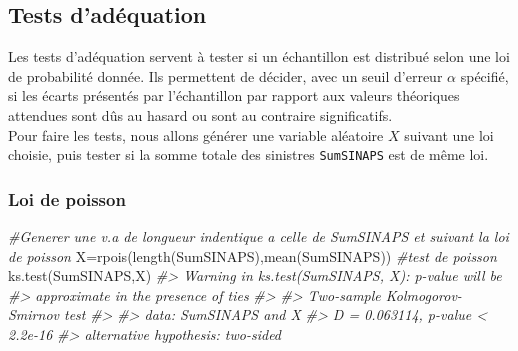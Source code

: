 \documentclass[
]{book}
\newenvironment{Shaded}{\begin{snugshade}}{\end{snugshade}}
\newcommand{\CommentTok}[1]{\textcolor[rgb]{0.56,0.35,0.01}{\textit{#1}}}
\newcommand{\FunctionTok}[1]{\textcolor[rgb]{0.00,0.00,0.00}{#1}}
\newcommand{\NormalTok}[1]{#1}
\newcommand{\OtherTok}[1]{\textcolor[rgb]{0.56,0.35,0.01}{#1}}
\newcommand{\SpecialCharTok}[1]{\textcolor[rgb]{0.00,0.00,0.00}{#1}}
\theoremstyle{definition}
\theoremstyle{definition}
\theoremstyle{definition}
\theoremstyle{definition}
\theoremstyle{remark}
\begin{document}
\hypertarget{tests-daduxe9quation}{%
\subsection{Tests d'adéquation}\label{tests-daduxe9quation}}

Les tests d'adéquation servent à tester si un échantillon est distribué selon une loi
de probabilité donnée. Ils permettent de décider, avec un seuil d'erreur \(\alpha\) spécifié, si les écarts présentés par l'échantillon par rapport aux valeurs théoriques attendues sont dûs au hasard ou sont au contraire significatifs.\\
Pour faire les tests, nous allons générer une variable aléatoire \(X\) suivant une loi choisie, puis tester si la somme totale des sinistres \texttt{SumSINAPS} est de même loi.

\begin{Shaded}
\end{Shaded}

\hypertarget{loi-de-poisson}{%
\subsubsection{Loi de poisson}\label{loi-de-poisson}}

\begin{Shaded}
\begin{Highlighting}[]
\CommentTok{\#Generer une v.a de longueur indentique a celle de SumSINAPS et suivant la loi de poisson}
\NormalTok{X}\OtherTok{=}\FunctionTok{rpois}\NormalTok{(}\FunctionTok{length}\NormalTok{(SumSINAPS),}\FunctionTok{mean}\NormalTok{(SumSINAPS))}
\CommentTok{\#test de poisson}
\FunctionTok{ks.test}\NormalTok{(SumSINAPS,X)}
\CommentTok{\#\textgreater{} Warning in ks.test(SumSINAPS, X): p{-}value will be}
\CommentTok{\#\textgreater{} approximate in the presence of ties}
\CommentTok{\#\textgreater{} }
\CommentTok{\#\textgreater{}  Two{-}sample Kolmogorov{-}Smirnov test}
\CommentTok{\#\textgreater{} }
\CommentTok{\#\textgreater{} data:  SumSINAPS and X}
\CommentTok{\#\textgreater{} D = 0.063114, p{-}value \textless{} 2.2e{-}16}
\CommentTok{\#\textgreater{} alternative hypothesis: two{-}sided}
\end{Highlighting}
\end{Shaded}
\end{document}
